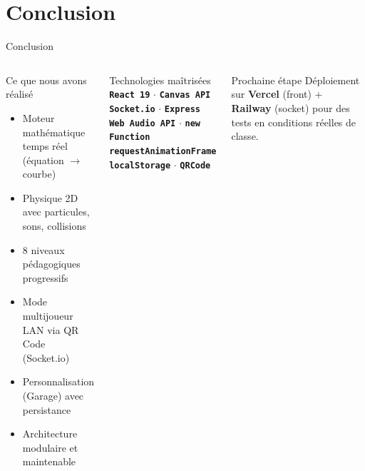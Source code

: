 \documentclass[aspectratio=169,12pt]{beamer}
\newcommand{\tech}[1]{\textcolor{mycyan}{\textbf{\texttt{#1}}}}
\begin{document}
\section{Conclusion}

\begin{frame}{Conclusion}
  \begin{columns}
    \begin{block}{Ce que nous avons r\'ealis\'e}
      \begin{itemize}
        \item[$\checkmark$] Moteur math\'ematique temps r\'eel (\'equation $\to$ courbe)
        \item[$\checkmark$] Physique 2D avec particules, sons, collisions
        \item[$\checkmark$] 8 niveaux p\'edagogiques progressifs
        \item[$\checkmark$] Mode multijoueur LAN via QR Code (Socket.io)
        \item[$\checkmark$] Personnalisation (Garage) avec persistance
        \item[$\checkmark$] Architecture modulaire et maintenable
      \end{itemize}
    \end{block}
    \begin{exampleblock}{Technologies ma\^itris\'ees}
      \tech{React 19} $\cdot$ \tech{Canvas API}\\
      \tech{Socket.io} $\cdot$ \tech{Express}\\
      \tech{Web Audio API} $\cdot$ \tech{new Function}\\
      \tech{requestAnimationFrame}\\
      \tech{localStorage} $\cdot$ \tech{QRCode}
    \end{exampleblock}
    \vspace{0.4cm}
    \begin{alertblock}{Prochaine \'etape}
      D\'eploiement sur \textbf{Vercel} (front) + \textbf{Railway} (socket)
      pour des tests en conditions r\'eelles de classe.
    \end{alertblock}
  \end{columns}
\end{frame}
\end{document}
